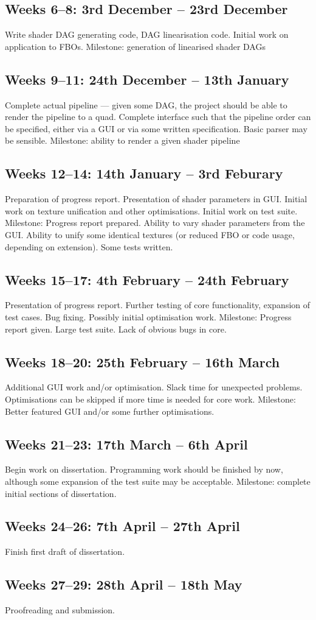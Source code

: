 \subsection*{Weeks 6--8: 3rd December -- 23rd December}
Write shader DAG generating code, DAG linearisation code. Initial work on application to FBOs.
Milestone: generation of linearised shader DAGs
\subsection*{Weeks 9--11: 24th December -- 13th January}
Complete actual pipeline --- given some DAG, the project should be able to render the pipeline to a
quad. Complete interface such that the pipeline order can be specified, either via a GUI or via some
written specification. Basic parser may be sensible.
Milestone: ability to render a given shader pipeline
\subsection*{Weeks 12--14: 14th January -- 3rd Feburary}
Preparation of progress report. Presentation of shader parameters in GUI. Initial
work on texture unification and other optimisations. Initial work on test suite.
Milestone: Progress report prepared. Ability to vary shader parameters from the GUI. Ability to
unify some identical textures (or reduced FBO or code usage, depending on extension). Some tests
written.
\subsection*{Weeks 15--17: 4th February -- 24th February}
Presentation of progress report. Further testing of core functionality, expansion of test cases. Bug
fixing. Possibly initial
optimisation work.
Milestone: Progress report given. Large test suite. Lack of obvious bugs in core.
\subsection*{Weeks 18--20: 25th February -- 16th March}
Additional GUI work and/or optimisation. Slack time for unexpected problems. Optimisations can
be skipped if more time is needed for core work.
Milestone: Better featured GUI and/or some further optimisations.
\subsection*{Weeks 21--23: 17th March -- 6th April}
Begin work on dissertation. Programming work should be finished by now, although some
expansion of the test suite may be acceptable.
Milestone: complete initial sections of dissertation.
\subsection*{Weeks 24--26: 7th April -- 27th April}
Finish first draft of dissertation.
\subsection*{Weeks 27--29: 28th April -- 18th May}
Proofreading and submission.
